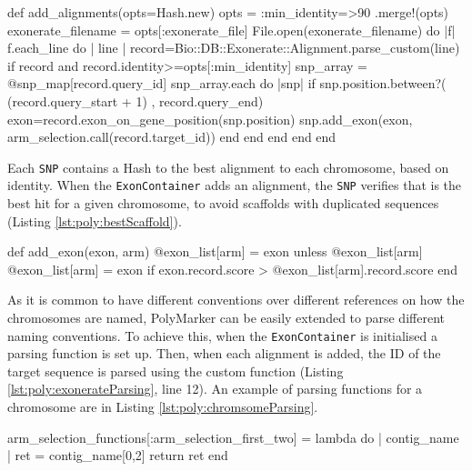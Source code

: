 \begin{code}[language=Ruby,caption={[\texttt{Bio::PolyploidTools::ExonContainer.add\_alignments}]Method in \texttt{Bio::PolyploidTools::ExonContainer} that adds to each SNP object the alignments}, label=lst:poly:exonerateParsing]
def add_alignments(opts=Hash.new) 
  opts = {:min_identity=>90 }.merge!(opts)
  exonerate_filename = opts[:exonerate_file]
  File.open(exonerate_filename) do |f|
    f.each_line do | line |
      record=Bio::DB::Exonerate::Alignment.parse_custom(line)
      if record and record.identity>=opts[:min_identity]
        snp_array = @snp_map[record.query_id]
        snp_array.each do |snp|                            
        if snp.position.between?( (record.query_start + 1) , record.query_end)
          exon=record.exon_on_gene_position(snp.position)
          snp.add_exon(exon, arm_selection.call(record.target_id))
        end
      end
    end
  end
end
\end{code}

Each \verb|SNP| contains a Hash to the best alignment to each chromosome, based on identity. 
When the \verb|ExonContainer| adds an alignment, the \verb|SNP| verifies that is the best hit for a given chromosome, to avoid scaffolds with duplicated sequences (Listing \ref{lst:poly:bestScaffold}).

\begin{code}[language=Ruby,caption={[Bio::PolyploidTools::SNP.add\_exon]Method in \texttt{Bio::PolyploidTools::SNP} that adds an alignment }, label=lst:poly:bestScaffold]
def add_exon(exon, arm)
  @exon_list[arm] = exon unless @exon_list[arm]
 @exon_list[arm] = exon if exon.record.score > @exon_list[arm].record.score
end
\end{code}

As it is common to have different conventions over different references on how the chromosomes are named, PolyMarker can be easily extended to parse different naming conventions. 
To achieve this, when the \verb|ExonContainer| is initialised a parsing function is set up. 
Then, when each alignment is added, the ID of the target sequence is parsed using the custom function (Listing \ref{lst:poly:exonerateParsing}, line 12).
An example of parsing functions for a chromosome are in Listing \ref{lst:poly:chromsomeParsing}.


\begin{code}[language=Ruby,caption={[Function that assigns a chromosome] Example function that assigns a chromosome from the two first letters of the scaffold}, label=lst:poly:chromsomeParsing]
arm_selection_functions[:arm_selection_first_two] = lambda do | contig_name |
  ret = contig_name[0,2]       
  return ret
end
\end{code}

